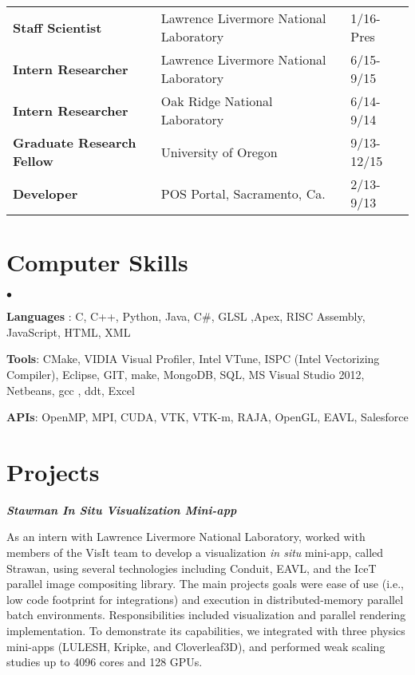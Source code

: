 \documentclass[margin,line]{res}
\newenvironment{list2}{
  \begin{list}{$\bullet$}{%
      \setlength{\itemsep}{0in}
      \setlength{\parsep}{0in} \setlength{\parskip}{0in}
      \setlength{\topsep}{0in} \setlength{\partopsep}{0in} 
      \setlength{\leftmargin}{0.2in}}}{\end{list}}
\begin{document}
\begin{resume}
\begin{tabular}{lll}
\textbf{Staff Scientist}	& Lawrence Livermore National Laboratory & 1/16-Pres \\
\textbf{Intern Researcher}	& Lawrence Livermore National Laboratory & 6/15-9/15 \\
\textbf{Intern Researcher}	& Oak Ridge National Laboratory & 6/14-9/14 \\
\textbf{Graduate Research Fellow}	& University of Oregon  & 9/13-12/15 \\
\textbf{Developer}	& POS Portal, Sacramento, Ca.  & 2/13-9/13 \\
\end{tabular}

\section{\sc Computer Skills} 
\begin{list2}
	\item \textbf{Languages} :  C, C++, Python, Java, C\#, GLSL ,Apex, RISC Assembly, JavaScript, HTML, XML
	\item \textbf{Tools}:  CMake, VIDIA Visual Profiler, Intel VTune, ISPC (Intel Vectorizing Compiler), Eclipse, GIT, make, MongoDB, SQL, MS Visual Studio 2012, Netbeans, gcc , ddt, Excel 
	\item \textbf{APIs}:  OpenMP, MPI, CUDA, VTK, VTK-m, RAJA, OpenGL, EAVL, Salesforce
\end{list2}

\section{\sc Projects}
{\em \textbf{Stawman In Situ Visualization Mini-app} }

\vspace{-.4cm}
As an intern with Lawrence Livermore National Laboratory, worked with members of the VisIt team to develop a visualization \textit{in situ} mini-app, called Strawan, using several technologies including Conduit, EAVL, and the IceT parallel image compositing library. The main projects goals were ease of use (i.e., low code footprint for integrations) and execution in distributed-memory parallel batch environments. Responsibilities included visualization and parallel rendering implementation. To demonstrate its capabilities, we integrated with three physics mini-apps (LULESH, Kripke, and Cloverleaf3D), and performed weak scaling studies up to 4096 cores and 128 GPUs. 


\end{resume}
\end{document}
